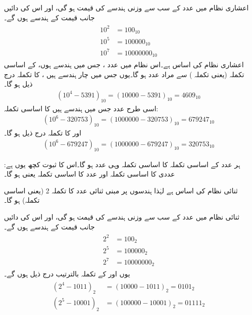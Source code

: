 اعشاری نظام میں عدد         کے  سب سے  وزنی   ہندسے کی قیمت    ہو گی، اور اس  کی  دائیں جانب   قیمت کے    ہندسے ہوں گے۔
\begin{gather}
\begin{aligned}
10^2&=100_{10}\\
10^5&=100000_{10}\\
10^7&=10000000_{10}
\end{aligned}
\end{gather}
اعشاری نظام کی   اساس    ہے۔اس نظام میں  عدد ،    جس میں    ہندسے ہوں،  کے اساسی تکملہ (یعنی  تکملہ )  سے مراد عدد  ہو گا۔یوں  جس   میں چار ہندسے    ہیں ، کا  تکملہ    درج ذیل ہو گا۔
\begin{align}
(10^4-5391)_{10}=(10000-5391)_{10}=4609_{10}
\end{align}
اسی طرح  عدد    جس میں   ہندسے ہیں کا اساسی تکملہ:
\begin{align}
(10^6-320753)_{10}=(1000000-320753)_{10}=679247_{10}
\end{align} 
اور    کا  تکملہ   درج ذیل ہو گا۔ 
\begin{align}
(10^6-679247)_{10}=(1000000-679247)_{10}=320753_{10}
\end{align} 

ہر عدد   کے اساسی تکملہ کا اساسی تکملہ وہی عدد   ہو گا۔اس کا ثبوت کچھ یوں  ہے: عددی  کا اساسی تکملہ  اور عدد    کا اساسی تکملہ  یعنی  ہو گا۔


ثنائی نظام کی   اساس    ہے لہٰذا    ہندسوں پر مبنی ثنائی عدد    کا  تکملہ 2  (یعنی اساسی تکملہ)       ہو گا۔

ثنائی  نظام میں عدد         کے  سب سے  وزنی   ہندسے کی قیمت    ہو گی، اور اس  کی  دائیں جانب   قیمت کے    ہندسے ہوں گے۔
\begin{gather}
\begin{aligned}
2^2&=100_2\\
2^5&=100000_2\\
2^7&=10000000_2
\end{aligned}
\end{gather}
یوں      اور    کے  تکملہ   بالترتیب  درج ذیل ہوں گے۔
\begin{gather}
\begin{aligned}\label{مساوات_حساب_تکملہ_اساسی}
(2^4-1011)_2&=(10000-1011)_2=0101_2\\
(2^5-10001)_2&=(100000-10001)_2=01111_2
\end{aligned}
\end{gather} 


